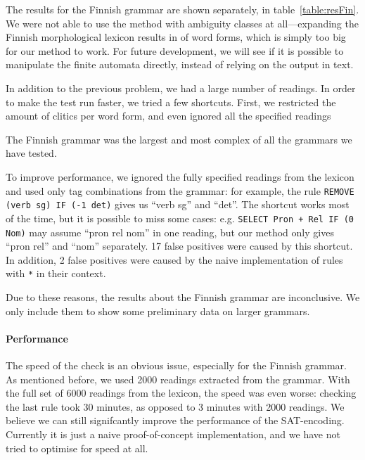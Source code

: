 The results for the Finnish grammar are shown separately, in table~\ref{table:resFin}.
We were not able to use the method with ambiguity classes at all---expanding the Finnish morphological lexicon results in  of word forms, which is simply too big for our method to work. 
For future development, we will see if it is possible to manipulate the finite automata directly, instead of relying on the output in text.

In addition to the previous problem, we had a large number of readings. In order to make the test run faster, we tried a few shortcuts. First, we restricted the amount of clitics per word form, and even ignored all the specified readings

The Finnish grammar was the largest and most complex of all the
grammars we have tested. 



To improve performance, we ignored the fully specified readings from the
lexicon and used only tag combinations from the grammar:
for example, the rule \texttt{REMOVE (verb sg) IF (-1 det)}
gives us ``verb sg'' and ``det''.
The shortcut works most of the time, but it is possible to
miss some cases: e.g. \texttt{SELECT Pron + Rel IF (0 Nom)} 
may assume ``pron rel nom'' in one reading, but our method only gives
``pron rel'' and ``nom'' separately. 
17 false positives were caused by this shortcut. 
In addition, 2 false positives were caused by the naive implementation of
rules with \verb!*! in their context.

Due to these reasons, the results about the Finnish grammar are
inconclusive. We only include them to show some preliminary data on larger grammars.

\paragraph{Performance} The speed of the check is an obvious issue,
especially for the Finnish grammar. 
As mentioned before, we used 2000 readings extracted from the grammar.
With the full set of 6000 readings from the lexicon, the speed
was even worse: checking the last rule took 30 minutes, as opposed to
3 minutes with 2000 readings. 
We believe we can still signifcantly improve the performance of the SAT-encoding. Currently it is just a naive proof-of-concept implementation, and we have not tried to optimise for speed at all.


